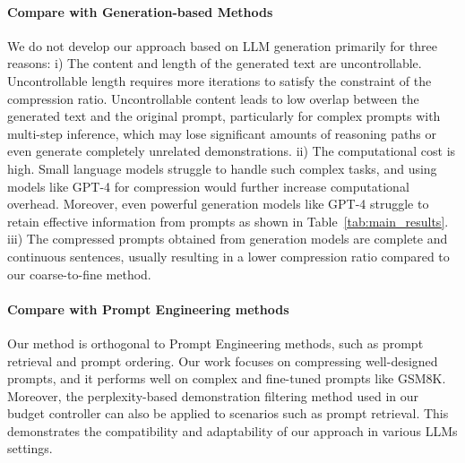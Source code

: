 \paragraph{Compare with Generation-based Methods}
We do not develop our approach based on LLM generation primarily for three reasons:
i) The content and length of the generated text are uncontrollable. Uncontrollable length requires more iterations to satisfy the constraint of the compression ratio.
Uncontrollable content leads to low overlap between the generated text and the original prompt, particularly for complex prompts with multi-step inference, which may lose significant amounts of reasoning paths or even generate completely unrelated demonstrations.
ii) The computational cost is high. Small language models struggle to handle such complex tasks, and using models like GPT-4 for compression would further increase computational overhead. Moreover, even powerful generation models like GPT-4 struggle to retain effective information from prompts as shown in Table~\ref{tab:main_results}.
iii) The compressed prompts obtained from generation models are complete and continuous sentences, usually resulting in a lower compression ratio compared to our coarse-to-fine method.


\paragraph{Compare with Prompt Engineering methods}

Our method is orthogonal to Prompt Engineering methods, such as prompt retrieval and prompt ordering. Our work focuses on compressing well-designed prompts, and it performs well on complex and fine-tuned prompts like GSM8K. Moreover, the perplexity-based demonstration filtering method used in our budget controller can also be applied to scenarios such as prompt retrieval. This demonstrates the compatibility and adaptability of our approach in various LLMs settings.

% 




